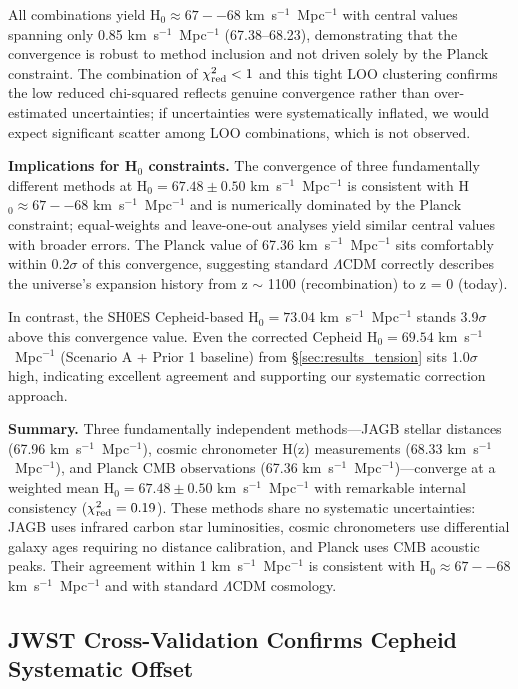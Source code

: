 \documentclass[preprint, linenumbers]{aastex701}
\begin{document}
All combinations yield H$_0 \approx 67--68$ km~s$^{-1}$~Mpc$^{-1}$ with central values spanning only 0.85 km~s$^{-1}$~Mpc$^{-1}$ (67.38--68.23), demonstrating that the convergence is robust to method inclusion and not driven solely by the Planck constraint. The combination of $\chi^2_{\rm red} < 1$ and this tight LOO clustering confirms the low reduced chi-squared reflects genuine convergence rather than over-estimated uncertainties; if uncertainties were systematically inflated, we would expect significant scatter among LOO combinations, which is not observed.

\textbf{Implications for H$_0$ constraints.} The convergence of three fundamentally different methods at H$_0 = 67.48 \pm 0.50$ km~s$^{-1}$~Mpc$^{-1}$ is consistent with H$_0 \approx 67--68$ km~s$^{-1}$~Mpc$^{-1}$ and is numerically dominated by the Planck constraint; equal-weights and leave-one-out analyses yield similar central values with broader errors. The Planck value of 67.36 km~s$^{-1}$~Mpc$^{-1}$ sits comfortably within 0.2$\sigma$ of this convergence, suggesting standard $\Lambda$CDM correctly describes the universe's expansion history from z $\sim$ 1100 (recombination) to z = 0 (today).

In contrast, the SH0ES Cepheid-based H$_0 = 73.04$ km~s$^{-1}$~Mpc$^{-1}$ \citep{Riess2022} stands 3.9$\sigma$ above this convergence value. Even the corrected Cepheid H$_0 = 69.54$ km~s$^{-1}$~Mpc$^{-1}$ (Scenario A + Prior 1 baseline) from \S\ref{sec:results_tension} sits 1.0$\sigma$ high, indicating excellent agreement and supporting our systematic correction approach.

\textbf{Summary.} Three fundamentally independent methods---JAGB stellar distances (67.96 km~s$^{-1}$~Mpc$^{-1}$), cosmic chronometer H(z) measurements (68.33 km~s$^{-1}$~Mpc$^{-1}$), and Planck CMB observations (67.36 km~s$^{-1}$~Mpc$^{-1}$)---converge at a weighted mean H$_0 = 67.48 \pm 0.50$ km~s$^{-1}$~Mpc$^{-1}$ with remarkable internal consistency ($\chi^2_{\rm red} = 0.19$). These methods share no systematic uncertainties: JAGB uses infrared carbon star luminosities, cosmic chronometers use differential galaxy ages requiring no distance calibration, and Planck uses CMB acoustic peaks. Their agreement within 1 km~s$^{-1}$~Mpc$^{-1}$ is consistent with H$_0 \approx 67--68$ km~s$^{-1}$~Mpc$^{-1}$ and with standard $\Lambda$CDM cosmology.

\subsection{JWST Cross-Validation Confirms Cepheid Systematic Offset}
\label{sec:results_jwst}
\end{document}
